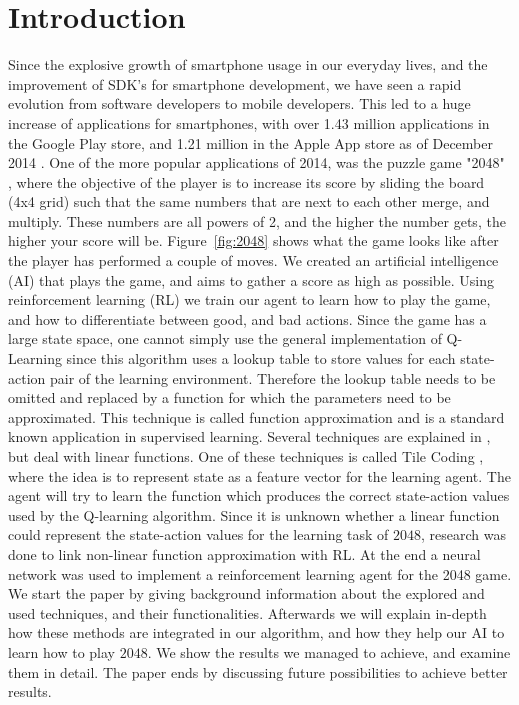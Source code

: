 \documentclass[a4paper,12pt]{article}
\begin{document}
\section{Introduction}
Since the explosive growth of smartphone usage in our everyday lives, and the improvement of SDK's for smartphone development, we have seen a rapid evolution from software developers to mobile developers. This led to a huge increase of applications for smartphones, with over 1.43 million applications in the Google Play store, and 1.21 million in the Apple App store as of December 2014 \cite{appstores}. One of the more popular applications of 2014, was the puzzle game "2048" \cite{2048}, where the objective of the player is to increase its score by sliding the board (4x4 grid) such that the same numbers that are next to each other merge, and multiply. These numbers are all powers of 2, and the higher the number gets, the higher your score will be. Figure~\ref{fig:2048} shows what the game looks like after the player has performed a couple of moves. We created an artificial intelligence (AI) that plays the game, and aims to gather a score as high as possible. Using reinforcement learning (RL) \cite{sutton1998rl} we train our agent to learn how to play the game, and how to differentiate between good, and bad actions. 
Since the game has a large state space, one cannot simply use the general implementation of Q-Learning \cite{sutton1998rl} since this algorithm uses a lookup table to store values for each state-action pair of the learning environment.
Therefore the lookup table needs to be omitted and replaced by a function for which the parameters need to be approximated.
This technique is called function approximation and is a standard known application in supervised learning.
Several techniques are explained in \cite{sutton1998rl}, but deal with linear functions.
One of these techniques is called Tile Coding \cite{sutton1998rl}, where the idea is to represent state as a feature vector for the learning agent.
The agent will try to learn the function which produces the correct state-action values used by the Q-learning algorithm.
Since it is unknown whether a linear function could represent the state-action values for the learning task of $2048$, research was done to link non-linear function approximation with RL.
At the end a neural network was used to implement a reinforcement learning agent for the 2048 game.
 We start the paper by giving background information about the explored and used techniques, and their functionalities. Afterwards we will explain in-depth how these methods are integrated in our algorithm, and how they help our AI to learn how to play $2048$. We show the results we managed to achieve, and examine them in detail. The paper ends by discussing future possibilities to achieve better results.
\end{document}
